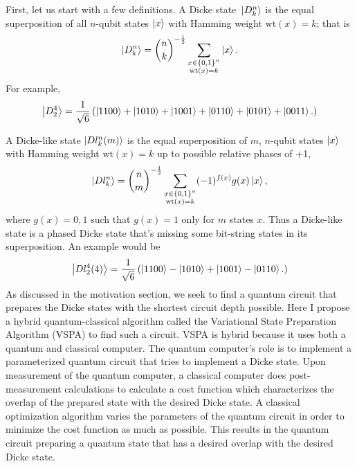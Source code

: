 \documentclass[10pt]{article}
\begin{document}
First, let us start with a few definitions. A Dicke state $\ket*{D^n_k}$ is the equal superposition of all $n$-qubit states $\ket{x}$ with Hamming weight $\text{wt}(x)=k$; that is
\begin{align}
\ket{D_k^n}={n \choose k}^{-\frac{1}{2}}
\sum_{\substack{x\in\{0,1\}^n\\ \textrm{wt}(x)=k}}\ket{x}.
\end{align}
For example,
\begin{align}
\ket{D^4_2}=\frac{1}{\sqrt{6}}
\left(
\ket{1100}+\ket{1010}+\ket{1001}+\ket{0110}+\ket{0101}+\ket{0011}.
\right)
\end{align}

A Dicke-like state $\ket{Dl^n_k(m)}$ is the equal superposition of $m$, $n$-qubit states $\ket{x}$ with Hamming weight $\text{wt}(x)=k$ up to possible relative phases of +1,
\begin{align}
\ket{Dl_k^n}={n \choose m}^{-\frac{1}{2}}
\sum_{\substack{x\in\{0,1\}^n\\ \textrm{wt}(x)=k}}(-1)^{f(x)}g(x)\ket{x}
,\end{align}
where $g(x)=0,1$ such that $g(x)=1$ only for $m$ states $x$. Thus a Dicke-like state is a phased Dicke state that's missing some bit-string states in its superposition. An example would be
\begin{align}
\ket{Dl^4_2(4)}=\frac{1}{\sqrt{6}}
\left(
\ket{1100}-\ket{1010}+\ket{1001}-\ket{0110}.
\right)
\end{align}
As discussed in the motivation section, we seek to find a quantum circuit that prepares the Dicke states with the shortest circuit depth possible. Here I propose a hybrid quantum-classical algorithm called the Variational State Preparation Algorithm (VSPA) to find such a circuit. VSPA is hybrid because it uses both a quantum and classical computer. The quantum computer's role is to implement a parameterized quantum circuit that tries to implement a Dicke state. Upon measurement of the quantum computer, a classical computer does post-measurement calculations to calculate a cost function which characterizes the overlap of the prepared state with the desired Dicke state. A classical optimization algorithm varies the parameters of the quantum circuit in order to minimize the cost function as much as possible. This results in the quantum circuit preparing a quantum state that has a desired overlap with the desired Dicke state. 
\end{document}
